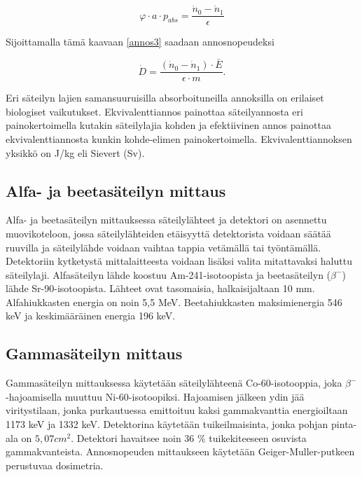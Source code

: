 \documentclass[a4paper,11pt]{article}
\begin{document}
\begin{equation}
  \varphi \cdot a \cdot p_{abs} = \frac{\dot{n}_0-\dot{n}_1}{\epsilon}
\end{equation}

Sijoittamalla tämä kaavaan \ref{annos3} saadaan annosnopeudeksi

\begin{equation}
  \dot{D} = \frac{(\dot{n}_0-\dot{n}_1) \cdot \bar{E}}{\epsilon \cdot m} .
\end{equation}

Eri säteilyn lajien samansuuruisilla absorboituneilla annoksilla on erilaiset biologiset vaikutukset. Ekvivalenttiannos painottaa säteilyannosta eri painokertoimella kutakin säteilylajia kohden ja efektiivinen annos painottaa ekvivalenttiannosta kunkin kohde-elimen painokertoimella. Ekvivalenttiannoksen yksikkö on J/kg eli Sievert (Sv).

\cite{ohje}

\subsection{Alfa- ja beetasäteilyn mittaus}
\label{laitteisto:alfabeeta}

Alfa- ja beetasäteilyn mittauksessa säteilylähteet ja detektori on asennettu muovikoteloon, jossa säteilylähteiden etäisyyttä detektorista voidaan säätää ruuvilla ja säteilylähde voidaan vaihtaa tappia vetämällä tai työntämällä. Detektoriin kytketystä mittalaitteesta voidaan lisäksi valita mitattavaksi haluttu säteilylaji. Alfasäteilyn lähde koostuu Am-241-isotoopista ja beetasäteilyn ($\beta^-$) lähde Sr-90-isotoopista. Lähteet ovat tasomaisia, halkaisijaltaan 10 mm. Alfahiukkasten energia on noin 5,5 MeV. Beetahiukkasten maksimienergia 546 keV ja keskimääräinen energia 196 keV. \cite{ohje}


\subsection{Gammasäteilyn mittaus}
\label{laitteisto:gamma}

Gammasäteilyn mittauksessa käytetään säteilylähteenä Co-60-isotooppia, joka $\beta^-$-hajoamisella muuttuu Ni-60-isotoopiksi. Hajoamisen jälkeen ydin jää viritystilaan, jonka purkautuessa emittoituu kaksi gammakvanttia energioiltaan 1173 keV ja 1332 keV. Detektorina käytetään tuikeilmaisinta, jonka pohjan pinta-ala on $5,07 cm^2$. Detektori havaitsee noin 36 \% tuikekiteeseen osuvista gammakvanteista. Annosnopeuden mittaukseen käytetään Geiger-Muller-putkeen perustuvaa dosimetria. \cite{ohje}
\end{document}

